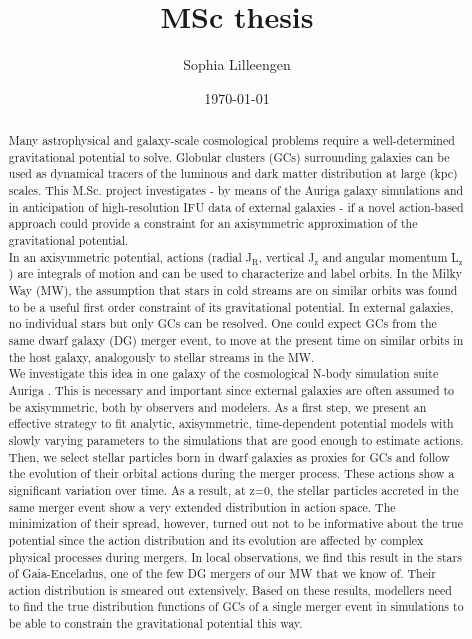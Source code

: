 \documentclass[a4paper,12pt,abstracton, twoside]{scrartcl}
\title{MSc thesis}
\author{Sophia Lilleengen}
\date{\today}
\begin{document}
 
\renewcommand{\bibname}{Bibliography}



\newpage
\thispagestyle{empty}
\begin{abstract}
\hspace{-12pt}Many astrophysical and galaxy-scale cosmological problems require a well-determined gravitational potential to solve. Globular clusters (GCs) surrounding galaxies can be used as dynamical tracers of the luminous and dark matter distribution at large (kpc) scales. This M.Sc. project investigates - by means of the Auriga galaxy simulations and in anticipation of high-resolution IFU data of external galaxies - if a novel action-based approach could provide a constraint for an axisymmetric approximation of the gravitational potential. \\
In an axisymmetric potential, actions (radial J$_\mathrm{R}$, vertical J$_\mathrm{z}$ and angular momentum L$_\mathrm{z}$) are integrals of motion and can be used to characterize and label orbits. In the Milky Way (MW), the assumption that stars in cold streams are on similar orbits was found to be a useful first order constraint of its gravitational potential. In external galaxies, no individual stars but only GCs can be resolved. One could expect GCs from the same dwarf galaxy (DG) merger event, to move at the present time on similar orbits in the host galaxy, analogously to stellar streams in the MW. \\
We investigate this idea in one galaxy of the cosmological N-body simulation suite Auriga \citep{AurigaGrand}. This is necessary and important since external galaxies are often assumed to be axisymmetric, both by observers and modelers. As a first step, we present an effective strategy to fit analytic, axisymmetric, time-dependent potential models with slowly varying parameters to the simulations that are good enough to estimate actions. \\
Then, we select stellar particles born in dwarf galaxies as proxies for GCs and follow the evolution of their orbital actions during the merger process. These actions show a significant variation over time. As a result, at z=0, the stellar particles accreted in the same merger event show a very extended distribution in action space. The minimization of their spread, however, turned out not to be informative about the true potential since the action distribution and its evolution are affected by complex physical processes during mergers. In local observations, we find this result in the stars of Gaia-Enceladus, one of the few DG mergers of our MW that we know of. Their action distribution is smeared out extensively. Based on these results, modellers need to find the true distribution functions of GCs of a single merger event in simulations to be able to constrain the gravitational potential this way.


\end{abstract}
\end{document}
